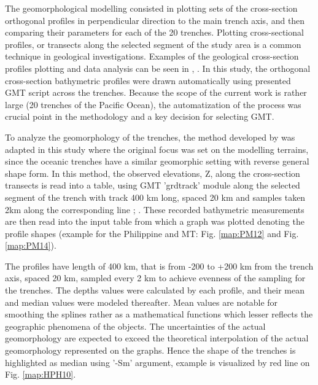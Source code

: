 \documentclass[11pt,a4paper]{report}
\begin{document}
{The geomorphological modelling consisted in plotting sets of the cross-section orthogonal profiles in perpendicular direction to the main trench axis, and then comparing their parameters for each of the 20 trenches. Plotting cross-sectional profiles, or transects along the selected segment of the study area is a common technique in geological investigations. Examples of the geological cross-section profiles plotting and data analysis can be seen in \cite{RossShor1965}, \cite{Mooreetal1982}. In this study, the orthogonal cross-section bathymetric profiles were drawn automatically using presented \ac{GMT} script across the trenches. Because the scope of the current work is rather large (20 trenches of the Pacific Ocean), the automatization of the process was crucial point in the methodology and a key decision for selecting \ac{GMT}. 

To analyze the geomorphology of the trenches, the method developed by \cite{WesselSmith1991} was adapted in this study where the original focus was set on the modelling terrains, since the oceanic trenches have a similar geomorphic setting with reverse general shape form. In this method, the observed elevations, Z, along the cross-section transects is read into a table, using \ac{GMT} 'grdtrack' module along the selected segment of the trench with track 400 km long, spaced 20 km and samples taken 2km along the corresponding line \cite{Lemenkova201994}; \cite{Lemenkova201995}. These recorded bathymetric measurements are then read into the input table from which a graph was plotted denoting the profile shapes (example for the Philippine and \ac{MT}: Fig. \ref{map:PM12} and Fig. \ref{map:PM14}). 

The profiles have length of 400 km, that is from -200 to +200 km from the trench axis, spaced 20 km, sampled every 2 km to achieve evenness of the sampling for the trenches. The depths values were calculated by each profile, and their mean and median values were modeled thereafter. Mean values are notable for smoothing the splines rather as a mathematical functions which lesser reflects the geographic phenomena of the objects. The uncertainties of the actual geomorphology are expected to exceed the theoretical interpolation of the actual geomorphology represented on the graphs. Hence the shape of the trenches is highlighted as median using ’-Sm’ argument, example is visualized by red line on Fig. \ref{map:HPH10}. 

}
\end{document}
